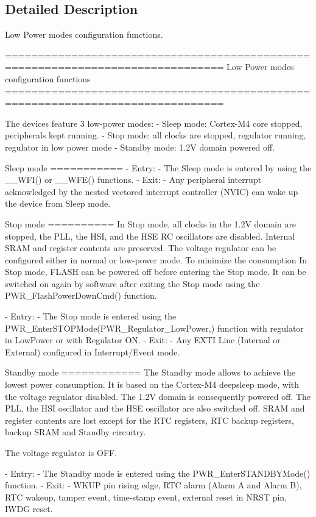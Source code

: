 \subsection{Detailed Description}
Low Power modes configuration functions. \begin{DoxyVerb} ===============================================================================
                    Low Power modes configuration functions
 ===============================================================================  

  The devices feature 3 low-power modes:
   - Sleep mode: Cortex-M4 core stopped, peripherals kept running.
   - Stop mode: all clocks are stopped, regulator running, regulator in low power mode
   - Standby mode: 1.2V domain powered off.
   
   Sleep mode
   ===========
    - Entry:
      - The Sleep mode is entered by using the __WFI() or __WFE() functions.
    - Exit:
      - Any peripheral interrupt acknowledged by the nested vectored interrupt 
        controller (NVIC) can wake up the device from Sleep mode.

   Stop mode
   ==========
   In Stop mode, all clocks in the 1.2V domain are stopped, the PLL, the HSI,
   and the HSE RC oscillators are disabled. Internal SRAM and register contents 
   are preserved.
   The voltage regulator can be configured either in normal or low-power mode.
   To minimize the consumption In Stop mode, FLASH can be powered off before 
   entering the Stop mode. It can be switched on again by software after exiting 
   the Stop mode using the PWR_FlashPowerDownCmd() function. 
   
    - Entry:
      - The Stop mode is entered using the PWR_EnterSTOPMode(PWR_Regulator_LowPower,) 
        function with regulator in LowPower or with Regulator ON.
    - Exit:
      - Any EXTI Line (Internal or External) configured in Interrupt/Event mode.
      
   Standby mode
   ============
   The Standby mode allows to achieve the lowest power consumption. It is based 
   on the Cortex-M4 deepsleep mode, with the voltage regulator disabled. 
   The 1.2V domain is consequently powered off. The PLL, the HSI oscillator and 
   the HSE oscillator are also switched off. SRAM and register contents are lost 
   except for the RTC registers, RTC backup registers, backup SRAM and Standby 
   circuitry.
   
   The voltage regulator is OFF.
      
    - Entry:
      - The Standby mode is entered using the PWR_EnterSTANDBYMode() function.
    - Exit:
      - WKUP pin rising edge, RTC alarm (Alarm A and Alarm B), RTC wakeup,
        tamper event, time-stamp event, external reset in NRST pin, IWDG reset.              


\end{DoxyVerb}
